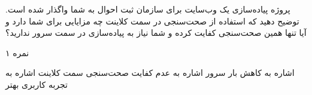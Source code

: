
پروژه پیاده‌سازی یک وب‌سایت برای سازمان ثبت احوال به شما واگذار شده است.
توضیح دهید که استفاده از صحت‌سنجی در سمت کلاینت چه مزایایی برای شما دارد و آیا تنها همین صحت‌سنجی کفایت کرده و شما نیاز به پیاده‌سازی در سمت سرور ندارید؟

۱ نمره

 اشاره به کاهش بار سرور
 اشاره به عدم کفایت صحت‌سنجی سمت کلاینت
 اشاره به تجربه کاربری بهتر

